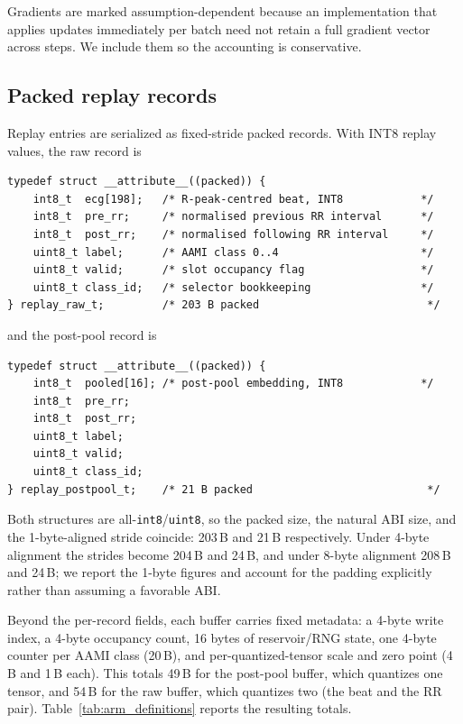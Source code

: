 Gradients are marked assumption-dependent because an implementation that applies
updates immediately per batch need not retain a full gradient vector across
steps. We include them so the accounting is conservative.

\subsection{Packed replay records}

Replay entries are serialized as fixed-stride packed records. With INT8 replay
values, the raw record is

\begin{verbatim}
typedef struct __attribute__((packed)) {
    int8_t  ecg[198];   /* R-peak-centred beat, INT8            */
    int8_t  pre_rr;     /* normalised previous RR interval      */
    int8_t  post_rr;    /* normalised following RR interval     */
    uint8_t label;      /* AAMI class 0..4                      */
    uint8_t valid;      /* slot occupancy flag                  */
    uint8_t class_id;   /* selector bookkeeping                 */
} replay_raw_t;         /* 203 B packed                          */
\end{verbatim}

and the post-pool record is

\begin{verbatim}
typedef struct __attribute__((packed)) {
    int8_t  pooled[16]; /* post-pool embedding, INT8            */
    int8_t  pre_rr;
    int8_t  post_rr;
    uint8_t label;
    uint8_t valid;
    uint8_t class_id;
} replay_postpool_t;    /* 21 B packed                           */
\end{verbatim}

Both structures are all-\texttt{int8}/\texttt{uint8}, so the packed size, the
natural ABI size, and the 1-byte-aligned stride coincide: 203\,B and 21\,B
respectively. Under 4-byte alignment the strides become 204\,B and 24\,B, and
under 8-byte alignment 208\,B and 24\,B; we report the 1-byte figures and
account for the padding explicitly rather than assuming a favorable ABI.

Beyond the per-record fields, each buffer carries fixed metadata: a 4-byte write
index, a 4-byte occupancy count, 16 bytes of reservoir/RNG state, one 4-byte
counter per AAMI class (20\,B), and per-quantized-tensor scale and zero point
(4\,B and 1\,B each). This totals 49\,B for the post-pool buffer, which quantizes
one tensor, and 54\,B for the raw buffer, which quantizes two (the beat and the
RR pair). Table~\ref{tab:arm_definitions} reports the resulting totals.

